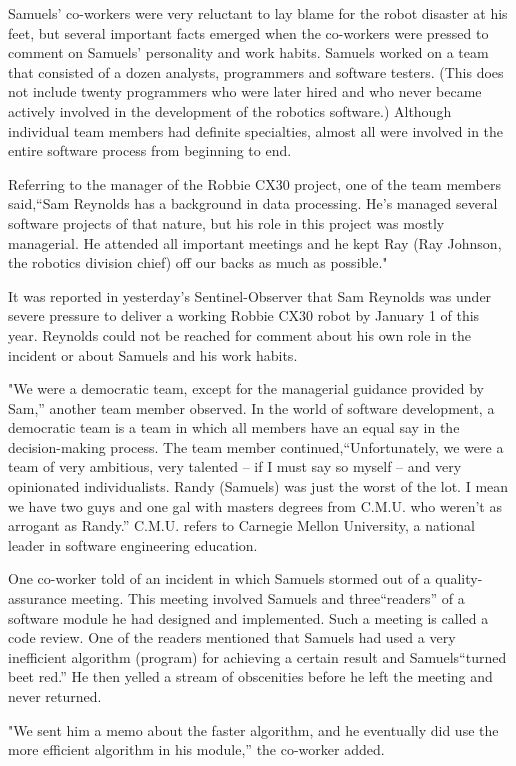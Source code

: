 Samuels' co-workers were very reluctant to lay blame for the robot disaster at his feet, but several important facts emerged when the co-workers were pressed to comment on Samuels' personality and work habits. Samuels worked on a team that consisted of a dozen analysts, programmers and software testers. (This does not include twenty programmers who were later hired and who never became actively involved in the development of the robotics software.) Although individual team members had definite specialties, almost all were involved in the entire software process from beginning to end.

Referring to the manager of the Robbie CX30 project, one of the team members said,``Sam Reynolds has a background in data processing. He's managed several software projects of that nature, but his role in this project was mostly managerial. He attended all important meetings and he kept Ray (Ray Johnson, the robotics division chief) off our backs as much as possible."

It was reported in yesterday's Sentinel-Observer that Sam Reynolds was under severe pressure to deliver a working Robbie CX30 robot by January 1 of this year. Reynolds could not be reached for comment about his own role in the incident or about Samuels and his work habits.

"We were a democratic team, except for the managerial guidance provided by Sam,'' another team member observed. In the world of software development, a democratic team is a team in which all members have an equal say in the decision-making process. The team member continued,``Unfortunately, we were a team of very ambitious, very talented -- if I must say so myself -- and very opinionated individualists. Randy (Samuels) was just the worst of the lot. I mean we have two guys and one gal with masters degrees from C.M.U. who weren't as arrogant as Randy.'' C.M.U. refers to Carnegie Mellon University, a national leader in software engineering education.

One co-worker told of an incident in which Samuels stormed out of a quality-assurance meeting. This meeting involved Samuels and three``readers'' of a software module he had designed and implemented. Such a meeting is called a code review. One of the readers mentioned that Samuels had used a very inefficient algorithm (program) for achieving a certain result and Samuels``turned beet red.'' He then yelled a stream of obscenities before he left the meeting and never returned.

"We sent him a memo about the faster algorithm, and he eventually did use the more efficient algorithm in his module,'' the co-worker added.


